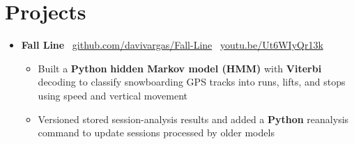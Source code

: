 \documentclass[letterpaper,11pt]{article}
\newcommand{\resumeItem}[1]{
  \item\small{
    {#1 \vspace{-2pt}}
  }
}
\newcommand{\resumeSubHeadingListStart}{\begin{itemize}[leftmargin=0.15in, label={}]}
\newcommand{\resumeSubHeadingListEnd}{\end{itemize}}
\newcommand{\resumeItemListStart}{\begin{itemize}}
\newcommand{\resumeItemListEnd}{\end{itemize}\vspace{-5pt}}
\begin{document}
\section{Projects}
    \resumeSubHeadingListStart
      \item
        \textbf{Fall Line} \textbar\
        \href{https://github.com/davivargas/Fall-Line}{github.com/davivargas/Fall-Line}
        \textbar\
        \href{https://www.youtube.com/watch?v=Ut6WIyQr13k}{youtu.be/Ut6WIyQr13k}
        \vspace{-4pt}
        \resumeItemListStart
          \resumeItem{Built a \textbf{Python} \textbf{hidden Markov model (HMM)} with \textbf{Viterbi} decoding to classify snowboarding GPS tracks into runs, lifts, and stops using speed and vertical movement}
          \resumeItem{Versioned stored session-analysis results and added a \textbf{Python} reanalysis command to update sessions processed by older models}
      \resumeItemListEnd
    \resumeSubHeadingListEnd
\end{document}
